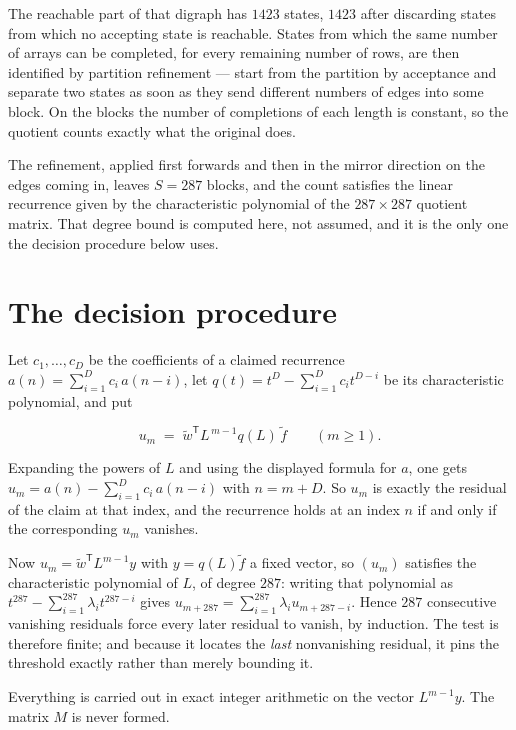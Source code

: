 \documentclass[11pt]{article}
\theoremstyle{definition}
\begin{document}
The reachable part of that digraph has $1423$ states, $1423$ after discarding states from which no accepting state is reachable. States from which the same number of arrays can be completed, for every remaining number of rows, are then identified by partition refinement --- start from the partition by acceptance and separate two states as soon as they send different numbers of edges into some block. On the blocks the number of completions of each length is constant, so the quotient counts exactly what the original does.

The refinement, applied first forwards and then in the mirror direction on the edges coming in, leaves $S = 287$ blocks, and the count satisfies the linear recurrence given by the characteristic polynomial of the $287 \times 287$ quotient matrix. That degree bound is computed here, not assumed, and it is the only one the decision procedure below uses.

\section{The decision procedure}

Let $c_1,\dots,c_D$ be the coefficients of a claimed recurrence $a(n) = \sum_{i=1}^{D} c_i\,a(n-i)$, let $q(t) = t^{D} - \sum_{i=1}^{D} c_i t^{D-i}$ be its characteristic polynomial, and put

\[u_m \;=\; \tilde w^{\mathsf T} L^{\,m-1} q(L)\,\tilde f \qquad (m \ge 1).\]

Expanding the powers of $L$ and using the displayed formula for $a$, one gets $u_m = a(n) - \sum_{i=1}^{D} c_i\,a(n-i)$ with $n = m + D$. So $u_m$ is exactly the residual of the claim at that index, and the recurrence holds at an index $n$ if and only if the corresponding $u_m$ vanishes.

Now $u_m = \tilde w^{\mathsf T} L^{m-1} y$ with $y = q(L)\tilde f$ a fixed vector, so $(u_m)$ satisfies the characteristic polynomial of $L$, of degree $287$: writing that polynomial as $t^{287} - \sum_{i=1}^{287} \lambda_i t^{287-i}$ gives $u_{m+287} = \sum_{i=1}^{287} \lambda_i u_{m+287-i}$. Hence $287$ consecutive vanishing residuals force every later residual to vanish, by induction. The test is therefore finite; and because it locates the {\itshape last} nonvanishing residual, it pins the threshold exactly rather than merely bounding it.

Everything is carried out in exact integer arithmetic on the vector $L^{m-1}y$. The matrix $M$ is never formed.
\end{document}

